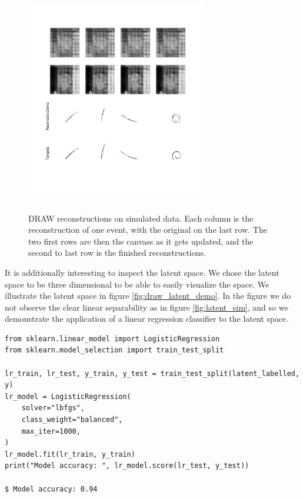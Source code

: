 \begin{figure}[ht]
	\centering
	\includegraphics[width=0.7\textwidth, height=10cm]{reconst.pdf}
	\caption[DRAW reconstructions on simulated data]{DRAW reconstructions on simulated data. Each column is the reconstruction of one event, with the original on the last row. The two first rows are then the canvass as it gets updated, and the second to last row is the finished reconstructions.}
	\label{fig:draw_reconst}
\end{figure}

It is additionally interesting to inspect the latent space. We chose the latent space to be three dimensional to be able to easily visualize the space. We illustrate the latent space in figure \ref{fig:draw_latent_demo}. In the figure we do not observe the clear linear separability as in figure \ref{fig:latent_sim}, and so we demonstrate the application of a linear regression classifier to the latent space.

\begin{minipage}{\linewidth}
\begin{lstlisting}[language=iPython]
from sklearn.linear_model import LogisticRegression
from sklearn.model_selection import train_test_split

lr_train, lr_test, y_train, y_test = train_test_split(latent_labelled, y)
lr_model = LogisticRegression(
	solver="lbfgs",
	class_weight="balanced",
	max_iter=1000,
)
lr_model.fit(lr_train, y_train)
print("Model accuracy: ", lr_model.score(lr_test, y_test))

$ Model accuracy: 0.94
\end{lstlisting}
\end{minipage}

